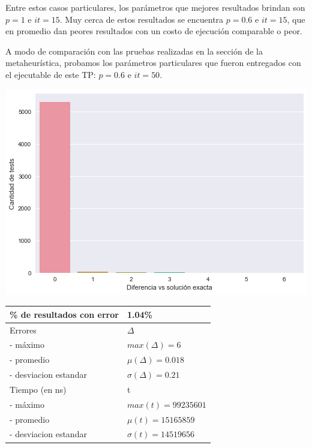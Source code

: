 Entre estos casos particulares, los parámetros que mejores resultados brindan son $p = 1$ e $it = 15$. Muy cerca de estos resultados se encuentra $p = 0.6$ e $it = 15$, que en promedio dan peores resultados con un costo de ejecución comparable o peor.

A modo de comparación con las pruebas realizadas en la sección de la metaheurística, probamos los parámetros particulares que fueron entregados con el ejecutable de este TP: $p = 0.6$ e $it = 50$.

\noindent
\begin{minipage}{0.55\textwidth}
    \hfill
    \includegraphics[scale=0.55]{img/accuracy-grasp50.png}
\end{minipage}
\hfill
\begin{minipage}{0.44\textwidth}
    \begin{center}

        \begin{tabular}{ | l l |}
            \hline
            \% de resultados con error & 1.04\% \\ \hline
            Errores & $\Delta$ \\
            - máximo & $max(\Delta) = 6$ \\
            - promedio & $\mu(\Delta) = 0.018$ \\
            - desviacion estandar & $\sigma(\Delta) = 0.21$ \\ \hline
            Tiempo (en ns) & t \\
            - máximo & $max(t) = 99235601 $ \\
            - promedio & $\mu(t) = 15165859$ \\
            - desviacion estandar & $\sigma(t) = 14519656$ \\
            \hline
        \end{tabular}
    \end{center}
\end{minipage}

